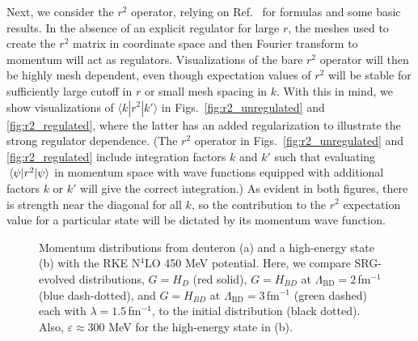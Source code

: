 \documentclass[10pt,aps,prc,floatfix,twocolumn,nofootinbib]{revtex4-1}
\newcommand{\LambdaBD}{{\Lambda_{\text{BD}}}}
\begin{document}
Next, we consider the $r^2$ operator, relying on Ref.~\cite{Anderson:2010aq} for formulas and some basic results.
In the absence of an explicit regulator for large $r$, the meshes used to create the $r^2$ matrix in coordinate space and then Fourier transform to momentum will act as regulators. 
Visualizations of the bare $r^2$ operator will then be highly mesh dependent, even though 
expectation values of $r^2$ will be stable for sufficiently large cutoff in $r$ or small mesh spacing in $k$.
With this in mind, we show visualizations of $\langle k | r^2 | k'\rangle$ in Figs.~\ref{fig:r2_unregulated} and \ref{fig:r2_regulated}, where the latter has an added regularization to illustrate the strong regulator dependence.
(The $r^2$ operator in Figs.~\ref{fig:r2_unregulated} and \ref{fig:r2_regulated} include integration factors $k$ and $k'$ such that evaluating $\mel{\psi}{r^2}{\psi}$ in momentum space with wave functions equipped with additional factors $k$ or $k'$ will give the correct integration.)
As evident in both figures, there is strength near the diagonal for all $k$, so the contribution to the $r^2$ expectation value for a particular state will be dictated by its momentum wave function.

%
\begin{figure}[tbh]
	\quad
	\caption{Momentum distributions from deuteron (a) and a high-energy state (b) with the RKE N$^4$LO 450 MeV potential. Here, we compare SRG-evolved distributions, $G=H_D$ (red solid), $G=H_{BD}$ at $\LambdaBD=2$\,fm$^{-1}$ (blue dash-dotted), and $G=H_{BD}$ at $\LambdaBD=3$\,fm$^{-1}$ (green dashed) each with $\lambda=1.5$\,fm$^{-1}$, to the initial distribution (black dotted). Also, $\varepsilon \approx 300$ MeV for the high-energy state in (b).}
	\label{fig:momentum_distributions_RKE}
\end{figure}
%
\end{document}
